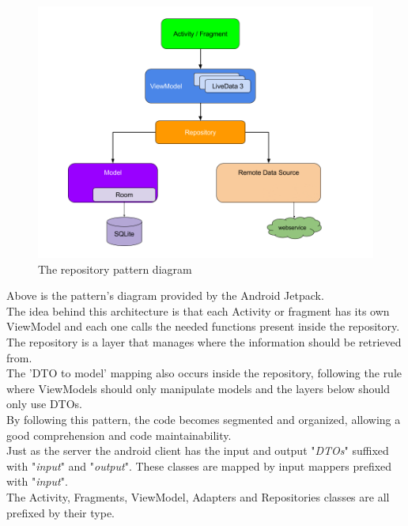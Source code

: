 \begin{figure}[H]
    \begin{center}
        \includegraphics[scale=0.5]{_figures/repository_pattern2.png}
        \caption{The repository pattern diagram}
    \end{center}
\end{figure}

Above is the pattern's diagram provided by the Android Jetpack.\\

The idea behind this architecture is that each Activity or fragment has its own ViewModel and each one calls the needed functions present inside the repository.
The repository is a layer that manages where the information should be retrieved from.\\

The 'DTO to model' mapping also occurs inside the repository, following the rule where ViewModels should only manipulate models and the layers below should only use DTOs.\\

By following this pattern, the code becomes segmented and organized, allowing a good comprehension and code maintainability.\\

Just as the server the android client has the input and output "\textit{DTOs}" suffixed with "\textit{input}" and "\textit{output}". 
These classes are mapped by input mappers prefixed with "\textit{input}".\\

The Activity, Fragments, ViewModel, Adapters and Repositories classes are all prefixed by their type.

